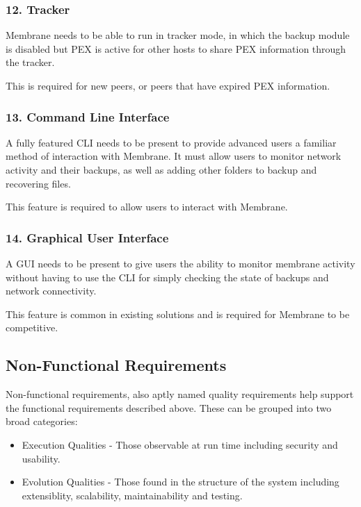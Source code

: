 \documentclass[11pt, a4paper, twoside]{report}
\begin{document}
\subsubsection{12. Tracker}

Membrane needs to be able to run in tracker mode, in which the backup module is disabled but PEX is active for other hosts to share PEX information through the tracker.

This is required for new peers, or peers that have expired PEX information.

\subsubsection{13. Command Line Interface}

A fully featured CLI needs to be present to provide advanced users a familiar method of interaction with Membrane. It must allow users to monitor network activity and their backups, as well as adding other folders to backup and recovering files.

This feature is required to allow users to interact with Membrane.

\subsubsection{14. Graphical User Interface} \label{sec:gui-req}

A GUI needs to be present to give users the ability to monitor membrane activity without having to use the CLI for simply checking the state of backups and network connectivity.

This feature is common in existing solutions and is required for Membrane to be competitive.

\subsection{Non-Functional Requirements}

Non-functional requirements, also aptly named quality requirements help support the functional requirements described above. These can be grouped into two broad categories:
\begin{itemize}
 \item Execution Qualities - Those observable at run time including security and usability.
 \item Evolution Qualities - Those found in the structure of the system including extensiblity, scalability, maintainability and testing.
\end{itemize}
\end{document}
